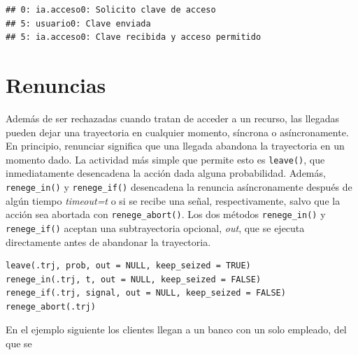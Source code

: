 \documentclass[
]{book}
\theoremstyle{definition}
\theoremstyle{definition}
\theoremstyle{definition}
\theoremstyle{definition}
\theoremstyle{remark}
\begin{document}
\begin{verbatim}
## 0: ia.acceso0: Solicito clave de acceso
## 5: usuario0: Clave enviada
## 5: ia.acceso0: Clave recibida y acceso permitido
\end{verbatim}

\hypertarget{renuncias}{%
\section{Renuncias}\label{renuncias}}

Además de ser rechazadas cuando tratan de acceder a un recurso, las llegadas pueden dejar una trayectoria en cualquier momento, síncrona o asíncronamente. En principio, renunciar significa que una llegada abandona la trayectoria en un momento dado. La actividad más simple que permite esto es \texttt{leave()}, que inmediatamente desencadena la acción dada alguna probabilidad. Además, \texttt{renege\_in()} y \texttt{renege\_if()} desencadena la renuncia asíncronamente después de algún tiempo \emph{timeout=t} o si se recibe una señal, respectivamente, salvo que la acción sea abortada con \texttt{renege\_abort()}. Los dos métodos \texttt{renege\_in()} y \texttt{renege\_if()} aceptan una subtrayectoria opcional, \emph{out}, que se ejecuta directamente antes de abandonar la trayectoria.

\begin{verbatim}
leave(.trj, prob, out = NULL, keep_seized = TRUE)
renege_in(.trj, t, out = NULL, keep_seized = FALSE)
renege_if(.trj, signal, out = NULL, keep_seized = FALSE)
renege_abort(.trj)
\end{verbatim}

En el ejemplo siguiente los clientes llegan a un banco con un solo empleado, del que se
\end{document}

